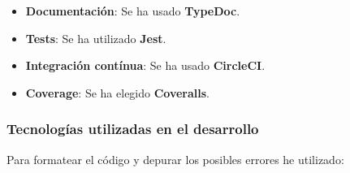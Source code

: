 \documentclass{beamer}
\begin{document}
\begin{frame}
\begin{itemize}
    \item \textbf{Documentación}: Se ha usado \textbf{TypeDoc}.
    \item \textbf{Tests}: Se ha utilizado \textbf{Jest}.
    \item \textbf{Integración contínua}: Se ha usado \textbf{CircleCI}.
    \item \textbf{Coverage}: Se ha elegido \textbf{Coveralls}.
\end{itemize}

\end{frame}

\begin{frame}
\frametitle{Tecnologías utilizadas en el desarrollo}

Para formatear el código y depurar los posibles errores he utilizado:


\end{frame}
\end{document}
